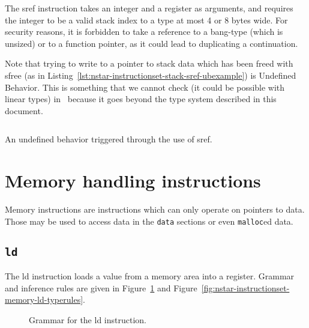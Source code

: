 The {\Iformat sref} instruction takes an integer and a register as arguments, and requires the integer to be a valid stack index to a type at most 4 or 8 bytes wide.
For security reasons, it is forbidden to take a reference to a bang-type (which is unsized) or to a function pointer, as it could lead to duplicating a continuation.

Note that trying to write to a pointer to stack data which has been freed with {\Iformat sfree} (as in Listing~\ref{lst:nstar-instructionset-stack-sref-ubexample}) is Undefined Behavior.
This is something that we cannot check (it could be possible with linear types) in \nstar\ because it goes beyond the type system described in this document.

\begin{listing}[H]
	\centering
	\inputminted{\nstarlexer}{examples/sref-undefined-behavior.nst}

	\caption{An undefined behavior triggered through the use of {\Iformat sref}.}
	\label{lst:nstar-instructionset-stack-sref-ubexample}
\end{listing}

\section{Memory handling instructions}\label{sec:nstar-instructionset-memory}

Memory instructions are instructions which can only operate on pointers to data.
Those may be used to access data in the \texttt{data} sections or even \texttt{malloc}ed data.

\subsection{\texttt{ld}}\label{subsec:nstar-instructionset-memory-ld}

The {\Iformat ld} instruction loads a value from a memory area into a register.
Grammar and inference rules are given in Figure~\ref{fig:nstar-instructionset-memory-ld-grammar} and Figure~\ref{fig:nstar-instructionset-memory-ld-typerules}.

\begin{figure}[H]
	\centering


	\caption{Grammar for the {\Iformat ld} instruction.}
	\label{fig:nstar-instructionset-memory-ld-grammar}
\end{figure}

